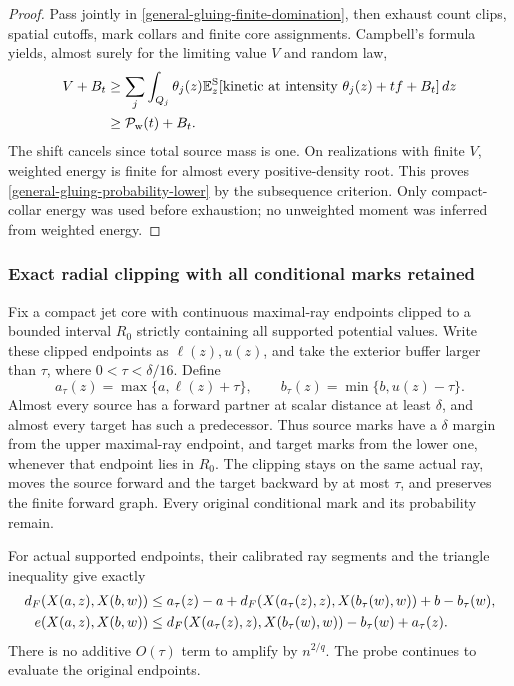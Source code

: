 \documentclass[11pt,reqno]{amsart}
\theoremstyle{definition}
\theoremstyle{remark}
\numberwithin{equation}{section}
\newcommand{\E}{\mathbb E}
\begin{document}
\begin{proof}
Pass jointly in \eqref{general-gluing-finite-domination}, then exhaust
count clips, spatial cutoffs, mark collars and finite core assignments.
Campbell's formula yields, almost surely for the limiting value \(V\)
and random law,
\begin{align*}
 V+B_t
 &\ge\sum_j\int_{Q_j}\theta_j(z)
     \E_z^{\rm S}[\text{kinetic at intensity }\theta_j(z)
                                      +t f+B_t]\,dz\\
 &\ge\mathcal P_{\mathrm w}(t)+B_t.
\end{align*}
The shift cancels since total source mass is one. On realizations with
finite \(V\), weighted energy is finite for almost every positive-density
root. This proves \eqref{general-gluing-probability-lower} by the
subsequence criterion. Only compact-collar energy was used before
exhaustion; no unweighted moment was inferred from weighted energy.
\end{proof}

\subsubsection{Exact radial clipping with all conditional marks retained}

Fix a compact jet core with continuous maximal-ray endpoints clipped to a
bounded interval \(R_0\) strictly containing all supported potential values.
Write these clipped endpoints as \(\ell(z),u(z)\), and take the exterior
buffer larger than \(\tau\), where \(0<\tau<\delta/16\). Define
\begin{equation}
\label{general-gluing-radial-clipping}
 a_\tau(z)=\max\{a,\ell(z)+\tau\},\qquad
 b_\tau(z)=\min\{b,u(z)-\tau\}.
\end{equation}
Almost every source has a forward partner at scalar distance at least
\(\delta\), and almost every target has such a predecessor. Thus source
marks have a \(\delta\) margin from the upper maximal-ray endpoint, and
target marks from the lower one, whenever that endpoint lies in \(R_0\).
The clipping stays on the same actual ray, moves the source forward and
the target backward by at most \(\tau\), and preserves the finite
forward graph. Every original conditional mark and its probability remain.

For actual supported endpoints, their calibrated ray segments and the
triangle inequality give exactly
\begin{align}
 d_F(X(a,z),X(b,w))
 &\le a_\tau(z)-a
       +d_F(X(a_\tau(z),z),X(b_\tau(w),w))
       +b-b_\tau(w),\notag\\
 e(X(a,z),X(b,w))
 &\le d_F(X(a_\tau(z),z),X(b_\tau(w),w))
                         -b_\tau(w)+a_\tau(z).
\label{general-gluing-exact-clipping}
\end{align}
There is no additive \(O(\tau)\) term to amplify by \(n^{2/q}\).
The probe continues to evaluate the original endpoints.
\end{document}
